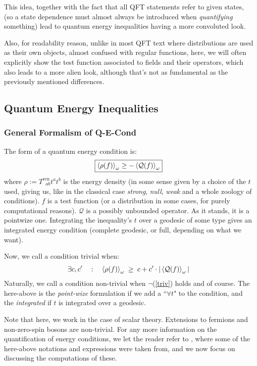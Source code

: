 \documentclass[a4paper,11pt]{article}
\numberwithin{equation}{section}
\theoremstyle{definition}
\begin{document}
This idea, together with the fact that all QFT statements refer to given states, (so a state dependence must almost always be introduced when \emph{quantifying} something) lead to quantum energy inequalities having a more convoluted look.

Also, for readability reason, unlike in most QFT text where distributions are used as their own objects, almost confused with regular functions, here, we will often explicitly show the test function associated to fields and their operators, which also leads to a more alien look, although that's not as fundamental as the previously mentioned differences.
\subsection{Quantum Energy Inequalities}
\subsubsection{General Formalism of Q-E-Cond}
The form of a quantum energy condition is:
\begin{equation}
\boxed{\braket{\rho(f)}_\omega \geq - \braket{\mathcal{Q}(f)}_\omega}
\end{equation}
where $\rho:=T^\mathrm{ren}_{\;\;ab}t^at^b$ is the energy density (in some sense given by a choice of the $t$ used, giving us, like in the classical case \emph{strong}, \emph{null}, \emph{weak} and a whole zoology of conditions). $f$ is a test function (or a distribution in some cases, for purely computational reasons). $\mathcal{Q}$ is a possibly unbounded operator. As it stands, it is a pointwize one. Integrating the inequality's $t$ over a geodesic of some type gives an integrated energy condition (complete geodesic, or full, depending on what we want).

\noindent Now, we call a condition trivial when:
\begin{equation} \label{triv}
    \exists c, c' \quad : \quad \braket{\rho(f)}_\omega \; \geq \; c + c'\cdot|\braket{\mathcal{Q}(f)}_\omega|
\end{equation}
Naturally, we call a condition non-trivial when $\lnot$(\ref{triv}) holds and of course. The here-above is the \textit{point-wize} formulation if we add a ``$\forall t$" to the condition, and the \textit{integrated} if $t$ is integrated over a geodesic.

Note that here, we work in the case of scalar theory. Extensions to fermions and non-zero-spin bosons are non-trivial. For any more information on the quantification of energy conditions, we let the reader refer to \cite{EleRev}, where some of the here-above notations and expressions were taken from, and we now focus on discussing the computations of these.
\end{document}
